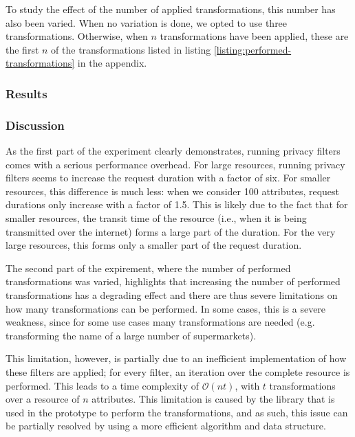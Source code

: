 \noindent To study the effect of the number of applied transformations, this number has also been varied. When no variation is done, we opted to use three transformations. Otherwise, when $n$ transformations have been applied, these are the first $n$ of the transformations listed in listing \ref{listing:performed-transformations} in the appendix.

\subsubsection{Results}




%

%

\subsubsection{Discussion}
As the first part of the experiment clearly demonstrates, running privacy filters comes with a serious performance overhead. For large resources, running privacy filters seems to increase the request duration with a factor of six. For smaller resources, this difference is much less: when we consider 100 attributes, request durations only increase with a factor of 1.5. This is likely due to the fact that for smaller resources, the transit time of the resource (i.e., when it is being transmitted over the internet) forms a large part of the duration. For the very large resources, this forms only a smaller part of the request duration.

The second part of the expirement, where the number of performed transformations was varied, highlights that increasing the number of performed transformations has a degrading effect and there are thus severe limitations on how many transformations can be performed. In some cases, this is a severe weakness, since for some use cases many transformations are needed (e.g. transforming the name of a large number of supermarkets).

This limitation, however, is partially due to an inefficient implementation of how these filters are applied; for every filter, an iteration over the complete resource is performed. This leads to a time complexity of $\mathcal{O}(nt)$, with $t$ transformations over a resource of $n$ attributes. This limitation is caused by the library that is used in the prototype to perform the transformations, and as such, this issue can be partially resolved by using a more efficient algorithm and data structure.


